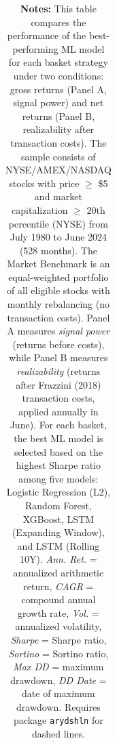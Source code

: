 \begin{table}[htbp]
{\begin{tabular}{l l r r r r r r r r}
\bottomrule
\end{tabular}}
\caption*{\textbf{Notes:} This table compares the performance of the best-performing ML model for each basket strategy under two conditions: gross returns (Panel A, signal power) and net returns (Panel B, realizability after transaction costs). The sample consists of NYSE/AMEX/NASDAQ stocks with price $\geq$ \$5 and market capitalization $\geq$ 20th percentile (NYSE) from July 1980 to June 2024 (528 months). The Market Benchmark is an equal-weighted portfolio of all eligible stocks with monthly rebalancing (no transaction costs). Panel A measures \textit{signal power} (returns before costs), while Panel B measures \textit{realizability} (returns after Frazzini (2018) transaction costs, applied annually in June). For each basket, the best ML model is selected based on the highest Sharpe ratio among five models: Logistic Regression (L2), Random Forest, XGBoost, LSTM (Expanding Window), and LSTM (Rolling 10Y). \textit{Ann. Ret.} = annualized arithmetic return, \textit{CAGR} = compound annual growth rate, \textit{Vol.} = annualized volatility, \textit{Sharpe} = Sharpe ratio, \textit{Sortino} = Sortino ratio, \textit{Max DD} = maximum drawdown, \textit{DD Date} = date of maximum drawdown. Requires package \texttt{arydshln} for dashed lines.}
\end{table}
